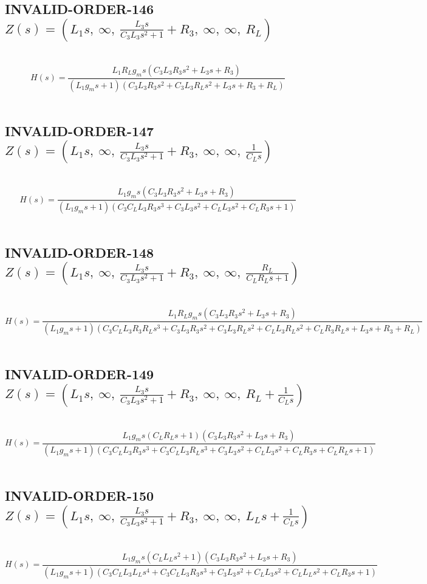 \documentclass{article}
\begin{document}
\subsection{INVALID-ORDER-146 $Z(s) = \left( L_{1} s, \  \infty, \  \frac{L_{3} s}{C_{3} L_{3} s^{2} + 1} + R_{3}, \  \infty, \  \infty, \  R_{L}\right)$ } \ 
\textbf{\[H(s) = \frac{L_{1} R_{L} g_{m} s \left(C_{3} L_{3} R_{3} s^{2} + L_{3} s + R_{3}\right)}{\left(L_{1} g_{m} s + 1\right) \left(C_{3} L_{3} R_{3} s^{2} + C_{3} L_{3} R_{L} s^{2} + L_{3} s + R_{3} + R_{L}\right)}\] } \ 
\subsection{INVALID-ORDER-147 $Z(s) = \left( L_{1} s, \  \infty, \  \frac{L_{3} s}{C_{3} L_{3} s^{2} + 1} + R_{3}, \  \infty, \  \infty, \  \frac{1}{C_{L} s}\right)$ } \ 
\textbf{\[H(s) = \frac{L_{1} g_{m} s \left(C_{3} L_{3} R_{3} s^{2} + L_{3} s + R_{3}\right)}{\left(L_{1} g_{m} s + 1\right) \left(C_{3} C_{L} L_{3} R_{3} s^{3} + C_{3} L_{3} s^{2} + C_{L} L_{3} s^{2} + C_{L} R_{3} s + 1\right)}\] } \ 
\subsection{INVALID-ORDER-148 $Z(s) = \left( L_{1} s, \  \infty, \  \frac{L_{3} s}{C_{3} L_{3} s^{2} + 1} + R_{3}, \  \infty, \  \infty, \  \frac{R_{L}}{C_{L} R_{L} s + 1}\right)$ } \ 
\textbf{\[H(s) = \frac{L_{1} R_{L} g_{m} s \left(C_{3} L_{3} R_{3} s^{2} + L_{3} s + R_{3}\right)}{\left(L_{1} g_{m} s + 1\right) \left(C_{3} C_{L} L_{3} R_{3} R_{L} s^{3} + C_{3} L_{3} R_{3} s^{2} + C_{3} L_{3} R_{L} s^{2} + C_{L} L_{3} R_{L} s^{2} + C_{L} R_{3} R_{L} s + L_{3} s + R_{3} + R_{L}\right)}\] } \ 
\subsection{INVALID-ORDER-149 $Z(s) = \left( L_{1} s, \  \infty, \  \frac{L_{3} s}{C_{3} L_{3} s^{2} + 1} + R_{3}, \  \infty, \  \infty, \  R_{L} + \frac{1}{C_{L} s}\right)$ } \ 
\textbf{\[H(s) = \frac{L_{1} g_{m} s \left(C_{L} R_{L} s + 1\right) \left(C_{3} L_{3} R_{3} s^{2} + L_{3} s + R_{3}\right)}{\left(L_{1} g_{m} s + 1\right) \left(C_{3} C_{L} L_{3} R_{3} s^{3} + C_{3} C_{L} L_{3} R_{L} s^{3} + C_{3} L_{3} s^{2} + C_{L} L_{3} s^{2} + C_{L} R_{3} s + C_{L} R_{L} s + 1\right)}\] } \ 
\subsection{INVALID-ORDER-150 $Z(s) = \left( L_{1} s, \  \infty, \  \frac{L_{3} s}{C_{3} L_{3} s^{2} + 1} + R_{3}, \  \infty, \  \infty, \  L_{L} s + \frac{1}{C_{L} s}\right)$ } \ 
\textbf{\[H(s) = \frac{L_{1} g_{m} s \left(C_{L} L_{L} s^{2} + 1\right) \left(C_{3} L_{3} R_{3} s^{2} + L_{3} s + R_{3}\right)}{\left(L_{1} g_{m} s + 1\right) \left(C_{3} C_{L} L_{3} L_{L} s^{4} + C_{3} C_{L} L_{3} R_{3} s^{3} + C_{3} L_{3} s^{2} + C_{L} L_{3} s^{2} + C_{L} L_{L} s^{2} + C_{L} R_{3} s + 1\right)}\] } \ 
\end{document}
